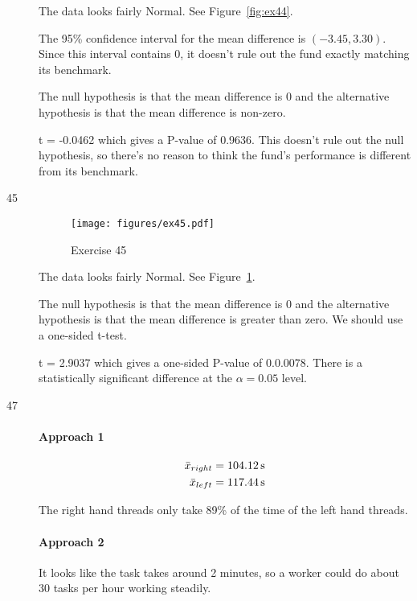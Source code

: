 \documentclass[letterpaper, landscape]{exam}
\begin{document}
\begin{description}
        The data looks fairly Normal. See Figure~\ref{fig:ex44}.

        The 95\% confidence interval for the mean difference is $(-3.45, 3.30)$.
        Since this interval contains 0, it doesn't rule out the fund exactly
        matching its benchmark.

        The null hypothesis is that the mean difference is 0 and the alternative
        hypothesis is that the mean difference is non-zero.

        t = -0.0462 which gives a P-value of 0.9636. This doesn't rule out the
        null hypothesis, so there's no reason to think the fund's performance is
        different from its benchmark.
        
      \item[45]
        \begin{figure}[H]
          \centering
          \texttt{[image: figures/ex45.pdf]}
          \caption{Exercise 45}\label{fig:ex45}
        \end{figure}

        The data looks fairly Normal. See Figure~\ref{fig:ex45}.

        The null hypothesis is that the mean difference is 0 and the alternative
        hypothesis is that the mean difference is greater than zero. We should
        use a one-sided t-test.

        t = 2.9037 which gives a one-sided P-value of 0.0.0078. There is a
        statistically significant difference at the $\alpha = 0.05$ level.
        
      \item[47]

        \paragraph{Approach 1}

        \begin{align*}
          \bar{x}_{right} &= \unit[104.12]{s} \\
          \bar{x}_{left} &= \unit[117.44]{s} \\
        \end{align*}

        The right hand threads only take 89\% of the time of the left hand
        threads.

        \paragraph{Approach 2}
        It looks like the task takes around 2 minutes, so a worker could do
        about 30 tasks per hour working steadily. 


\end{description}
\end{document}
